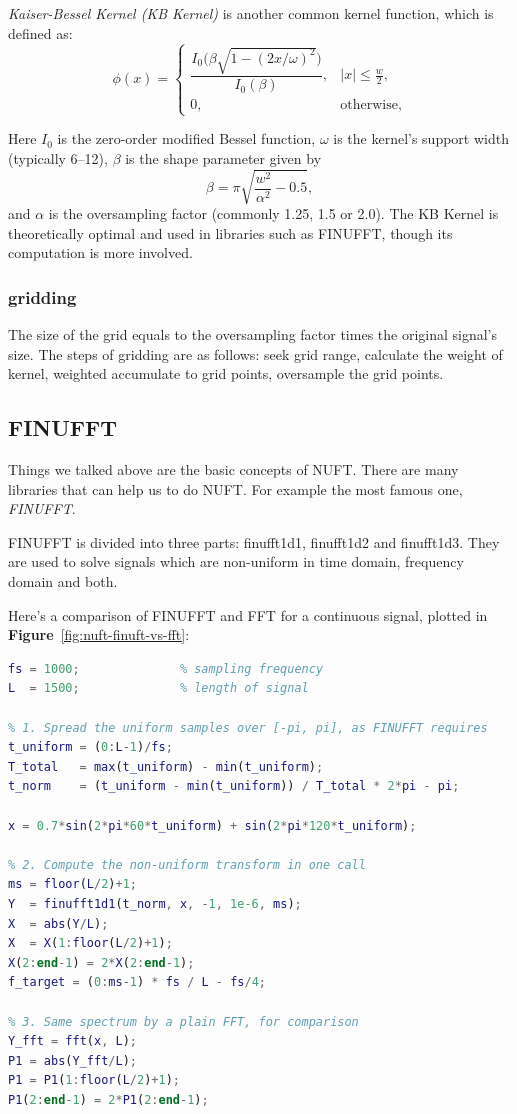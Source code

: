 \documentclass[10pt,a4paper,oneside,numbers=noenddot]{scrbook}
\newcommand*{\figref}[1]{\textbf{Figure}~\ref{#1}}
\theoremstyle{ctplain}
\theoremstyle{ctresult}
\begin{document}
\emph{Kaiser-Bessel Kernel (KB Kernel)} is another common kernel function, which is
defined as:
\[
  \phi(x) =
  \begin{cases}
    \dfrac{I_0\!\bigl(\beta\sqrt{1 - (2x/\omega)^2}\bigr)}{I_0(\beta)}, & |x|\le
    \tfrac{w}{2},\\ 0, & \text{otherwise},
  \end{cases}
\]

Here $I_0$ is the zero-order modified Bessel function, $\omega$ is the kernel’s support
width (typically 6–12), $\beta$ is the shape parameter given by
\[
  \beta = \pi\sqrt{\frac{w^2}{\alpha^2} - 0.5},
\]
and $\alpha$ is the oversampling factor (commonly 1.25, 1.5 or 2.0). The KB Kernel is
theoretically optimal and used in libraries such as FINUFFT, though its computation is
more involved.

\subsubsection{gridding}
The size of the grid equals to the oversampling factor times the original signal's size.
The steps of gridding are as follows: seek grid range, calculate the weight of kernel,
weighted accumulate to grid points, oversample the grid points.

\subsection{FINUFFT}

Things we talked above are the basic concepts of NUFT. There are many libraries
that can help us to do NUFT. For example the most famous one, \emph{FINUFFT}.

FINUFFT is divided into three parts: finufft1d1, finufft1d2 and finufft1d3. They are
used to solve signals which are non-uniform in time domain, frequency domain and
both.

Here's a comparison of FINUFFT and FFT for a continuous signal, plotted in
\figref{fig:nuft-finuft-vs-fft}:
\begin{lstlisting}[language=Matlab]
fs = 1000;              % sampling frequency
L  = 1500;              % length of signal

% 1. Spread the uniform samples over [-pi, pi], as FINUFFT requires
t_uniform = (0:L-1)/fs;
T_total   = max(t_uniform) - min(t_uniform);
t_norm    = (t_uniform - min(t_uniform)) / T_total * 2*pi - pi;

x = 0.7*sin(2*pi*60*t_uniform) + sin(2*pi*120*t_uniform);

% 2. Compute the non-uniform transform in one call
ms = floor(L/2)+1;
Y  = finufft1d1(t_norm, x, -1, 1e-6, ms);
X  = abs(Y/L);
X  = X(1:floor(L/2)+1);
X(2:end-1) = 2*X(2:end-1);
f_target = (0:ms-1) * fs / L - fs/4;

% 3. Same spectrum by a plain FFT, for comparison
Y_fft = fft(x, L);
P1 = abs(Y_fft/L);
P1 = P1(1:floor(L/2)+1);
P1(2:end-1) = 2*P1(2:end-1);
\end{lstlisting}
\end{document}
